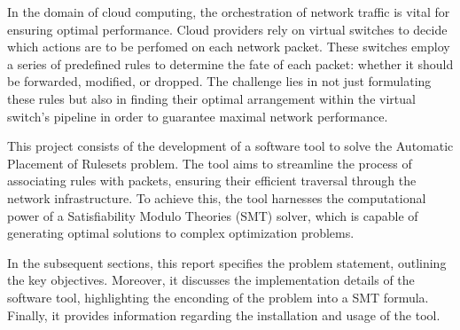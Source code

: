 In the domain of cloud computing, the orchestration of network traffic is vital for ensuring optimal performance. Cloud providers rely on virtual switches to decide which actions are to be perfomed on each network packet. These switches employ a series of predefined rules to determine the fate of each packet: whether it should be forwarded, modified, or dropped. The challenge lies in not just formulating these rules but also in finding their optimal arrangement within the virtual switch's pipeline in order to guarantee maximal network performance.

This project consists of the development of a software tool to solve the Automatic Placement of Rulesets problem. The tool aims to streamline the process of associating rules with packets, ensuring their efficient traversal through the network infrastructure. To achieve this, the tool harnesses the computational power of a Satisfiability Modulo Theories  (SMT) solver, which is capable of generating optimal solutions to complex optimization problems.

In the subsequent sections, this report specifies the problem statement, outlining the key objectives. Moreover, it discusses the implementation details of the software tool, highlighting the enconding of the problem into a SMT formula. Finally, it provides information regarding the installation and usage of the tool.
